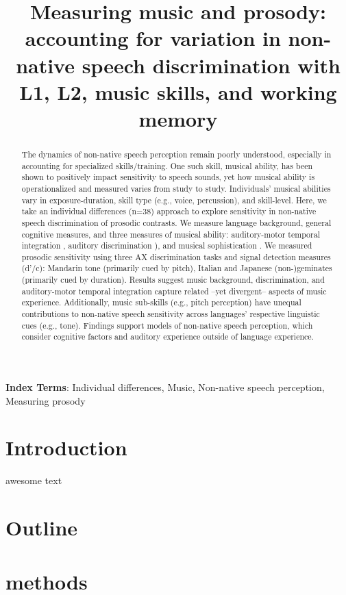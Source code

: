 \documentclass[a4paper]{article}
\title{Measuring music and prosody: accounting for variation in non-native speech discrimination with L1, L2, music skills, and working memory}
\begin{document}
\maketitle
% 
\begin{abstract}
The dynamics of non-native speech perception remain poorly understood, especially in accounting for specialized skills/training. One such skill, musical ability, has been shown to positively impact sensitivity to speech sounds, yet how musical ability is operationalized and measured varies from study to study. Individuals’ musical abilities vary in exposure-duration, skill type (e.g., voice, percussion), and skill-level. Here, we take an individual differences (n=38) approach to explore sensitivity in non-native speech discrimination of prosodic contrasts. We measure language background, general cognitive measures, and three measures of musical ability: auditory-motor temporal integration \cite{Kachlicka_Saito_Tierney_2019}, auditory discrimination \cite[MET;]{Wallentin_Nielsen_Friis-Olivarius_Vuust_Vuust_2010}), and musical sophistication \cite[Gold-MSI;]{Müllensiefen_Gingras_Musil_Stewart_2014}. We measured prosodic sensitivity using three AX discrimination tasks and signal detection measures (d'/c): Mandarin tone (primarily cued by pitch), Italian and Japanese (non-)geminates (primarily cued by duration). Results suggest music background, discrimination, and auditory-motor temporal integration capture related –yet divergent– aspects of music experience. Additionally, music sub-skills (e.g., pitch perception) have unequal contributions to non-native speech sensitivity across languages' respective linguistic cues (e.g., tone). Findings support models of non-native speech perception, which consider cognitive factors and auditory experience outside of language experience.

\end{abstract}
\noindent\textbf{Index Terms}:  Individual differences, Music, Non-native speech perception, Measuring prosody


\section{Introduction}
awesome text

\section{Outline}


\section{methods}
\end{document}
